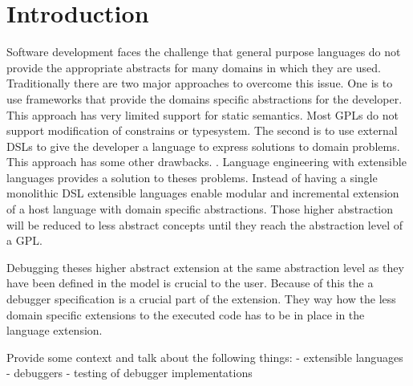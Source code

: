 \section{Introduction}
Software development faces the challenge that general purpose languages do not provide the appropriate abstracts for many domains in which they are used. Traditionally there are two major approaches to overcome this issue. One is to use frameworks that provide the domains specific abstractions for the developer. This approach has very limited support for static semantics. Most \acp{GPL} do not support modification of constrains or typesystem. The second is to use external \acp{DSL} to give the developer a language to express solutions to domain problems. This approach has some other drawbacks. .
Language engineering with extensible languages provides a solution to theses problems. Instead of having a single monolithic \ac{DSL} extensible languages enable modular and incremental extension of a host language with domain specific abstractions. Those higher abstraction will be reduced to less abstract concepts until they reach the abstraction level of a \ac{GPL}.

Debugging theses higher abstract extension at the same abstraction level as they have been defined in the model is crucial to the user. Because of this the a debugger specification is a crucial part of the extension. They way how the less domain specific extensions to the executed code has to be in place in the language extension. 
 

Provide some context and talk about the following things:
- extensible languages
- debuggers 
- testing of debugger implementations
